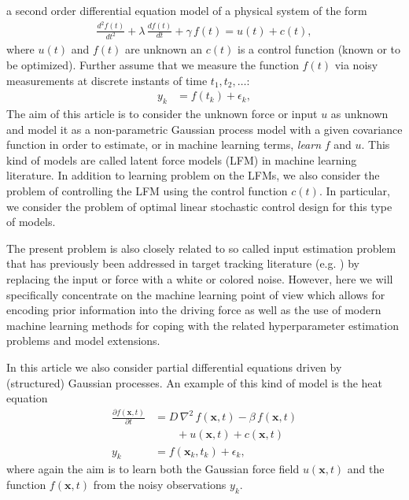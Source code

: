 \documentclass[journal]{IEEEtran}
\begin{document}
 a second order differential equation model of a physical system of the form
%
\begin{equation}
\begin{split}
  \frac{d^{2}f(t)}{dt^{2}} + \lambda \, \frac{df(t)}{dt} + \gamma \, f(t) = u(t) + c(t),
\end{split}
\label{eq:sde0}
\end{equation}
%
where $u(t)$ and $f(t)$ are unknown an $c(t)$ is a control function (known or to be optimized). Further assume that we measure the function $f(t)$ via noisy measurements at discrete instants of time $t_1,t_2,\ldots$:
%
\begin{equation}
\begin{split}
  y_k &= f(t_k) + \epsilon_k,
\end{split}
\end{equation}
%
The aim of this article is to consider the unknown force or input $u$ as unknown and model it as a non-parametric Gaussian process model \cite{Rasmussen+Williams:2006} with a given covariance function in order to estimate, or in machine learning terms, {\em learn} $f$ and $u$. This kind of models are called latent force models (LFM) \cite{Alvarez+Luengo+Lawrence:2009,Alvarez:2010,Alvarez+Luengo+Lawrence:2013} in machine learning literature. In addition to learning problem on the LFMs, we also consider the problem of controlling the LFM using the control function $c(t)$. In particular, we consider the problem of optimal linear stochastic control design for this type of models.

The present problem is also closely related to so called input estimation problem that has previously been addressed in target tracking literature (e.g. \cite{Bar-Shalom+Li+Kirubarajan:2001}) by replacing the input or force with a white or colored noise. However, here we will specifically concentrate on the machine learning point of view which allows for encoding prior information into the driving force as well as the use of modern machine learning methods for coping with the related hyperparameter estimation problems and model extensions.

In this article we also consider partial differential equations driven by (structured) Gaussian processes. An example of this kind of model is the heat equation
%
\begin{equation}
\begin{split}
  \frac{\partial f(\mathbf{x},t)}{\partial t} &=
  D \, \nabla^2 \, f(\mathbf{x},t) - \beta \, f(\mathbf{x},t) \\
  &\qquad + u(\mathbf{x},t) + c(\mathbf{x},t) \\
  y_k &= f(\mathbf{x}_k,t_k) + \epsilon_k,
\end{split}
\label{eq:sde0}
\end{equation}
%
where again the aim is to learn both the Gaussian force field $u(\mathbf{x},t)$ and the function $f(\mathbf{x},t)$ from the noisy observations $y_k$. 
\end{document}
